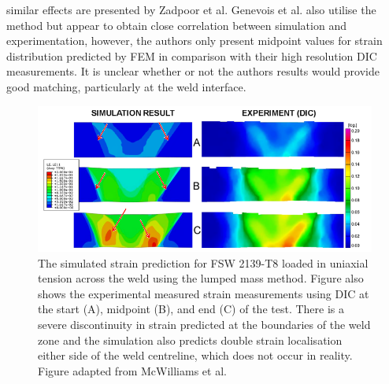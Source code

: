 similar effects are presented by
Zadpoor et al. \cite{Zadpoor2009} 
Genevois et al. \cite{Genevois2006} also utilise the method but appear to obtain close correlation between simulation and experimentation,
however, the authors only present midpoint values for strain distribution predicted by FEM in comparison with their high resolution DIC measurements. 
It is unclear whether or not the authors results would provide good matching, particularly at the weld interface. 


\begin{figure}[h!]
	\centering
	\includegraphics[width=1\linewidth]{Figures/LiteratureReview/LumpedMassMcwilliams}
	\caption[Lumped mass prediction]{The simulated strain prediction for FSW 2139-T8 loaded in uniaxial tension across the weld using the lumped mass method. Figure also shows the experimental measured strain measurements using DIC at the start (A), midpoint (B), and end (C) of the test. There is a severe discontinuity in strain predicted at the boundaries of the weld zone and the simulation also predicts double strain localisation either side of the weld centreline, which does not occur in reality. Figure adapted from McWilliams et al. \cite{McWilliams2013}}
	\label{fig:LumpedMassMcwilliams}
\end{figure}

